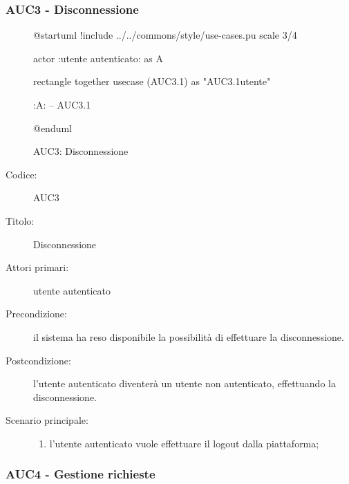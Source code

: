 \documentclass[casi-duso]{subfiles}
\begin{document}
\subsubsection{AUC3 - Disconnessione}%
\label{subsub:AUC3}

\begin{figure}[h!]
  \centering
  \begin{plantuml}
  @startuml
  !include ../../commons/style/use-cases.pu
  scale 3/4

  actor :utente autenticato: as A

  rectangle {
    together {
      usecase (AUC3.1) as "AUC3.1\nDisconnessione utente"
    }
  }

  :A: -- AUC3.1

  @enduml
  \end{plantuml}
  \caption{AUC3: Disconnessione}
  \label{fig:auc3}
\end{figure}

\begin{description}
  \item[Codice:] AUC3
  \item[Titolo:] Disconnessione
  \item[Attori primari:] utente autenticato
  \item[Precondizione:] il sistema ha reso disponibile la possibilità di effettuare la disconnessione.
  \item[Postcondizione:] l'utente autenticato diventerà un utente non autenticato, effettuando la disconnessione.
  \item[Scenario principale:]
  \begin{enumerate}
    \item l'utente autenticato vuole effettuare il logout dalla piattaforma;
  \end{enumerate}
\end{description}

\subsubsection{AUC4 - Gestione richieste}%
\label{subsub:AUC4}
\end{document}
